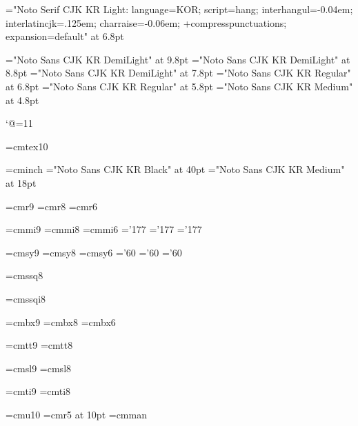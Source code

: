 \sethangulfont\sevenmj="Noto Serif CJK KR Light:%
  language=KOR;%
  script=hang;%
  interhangul=-0.04em;%
  interlatincjk=.125em;%
  charraise=-0.06em;%
  +compresspunctuations;%
  expansion=default" at 6.8pt

\font\texthangul="Noto Sans CJK KR DemiLight" at 9.8pt
\font\texthangulnine="Noto Sans CJK KR DemiLight" at 8.8pt
\font\texthanguleight="Noto Sans CJK KR DemiLight" at 7.8pt
\font\scripthangul="Noto Sans CJK KR Regular" at 6.8pt
\font\scripthangulsix="Noto Sans CJK KR Regular" at 5.8pt
\font\scriptscripthangul="Noto Sans CJK KR Medium" at 4.8pt

%
\catcode`@=11 %

\font\tentex=cmtex10

\font\inchhigh=cminch
\font\titlefont="Noto Sans CJK KR Black" at 40pt
\font\sectionfont="Noto Sans CJK KR Medium" at 18pt

\font\ninerm=cmr9
\font\eightrm=cmr8
\font\sixrm=cmr6

\font\ninei=cmmi9
\font\eighti=cmmi8
\font\sixi=cmmi6
\skewchar\ninei='177 \skewchar\eighti='177 \skewchar\sixi='177

\font\ninesy=cmsy9
\font\eightsy=cmsy8
\font\sixsy=cmsy6
\skewchar\ninesy='60 \skewchar\eightsy='60 \skewchar\sixsy='60

\font\eightss=cmssq8

\font\eightssi=cmssqi8

\font\ninebf=cmbx9
\font\eightbf=cmbx8
\font\sixbf=cmbx6

\font\ninett=cmtt9
\font\eighttt=cmtt8

\hyphenchar{} %
\hyphenchar{}
\hyphenchar{}

\font\ninesl=cmsl9
\font\eightsl=cmsl8

\font\nineit=cmti9
\font\eightit=cmti8

\font\tenu=cmu10 %
\font\magnifiedfiverm=cmr5 at 10pt
\font\cmman=cmman %

%
\newskip\ttglue
\def\tenpoint{\def\rm{\fam0\tenrm\tenmj}%
  \textfont0=\tenrm \scriptfont0=\sevenrm \scriptscriptfont0=\fiverm
  \textfont1=\teni \scriptfont1=\seveni \scriptscriptfont1=\fivei
  \textfont2=\tensy \scriptfont2=\sevensy \scriptscriptfont2=\fivesy
  \textfont3=\tenex \scriptfont3=\tenex \scriptscriptfont3=\tenex
  \setmathhangulfonts\texthangul\scripthangul\scriptscripthangul
  \def\it{\fam\itfam\tenit\tensn}%
  \textfont\itfam=\tenit
  \def\sl{\fam\slfam\tensl\tensn}%
  \textfont\slfam=\tensl
  \def\bf{\fam\bffam\tenbf\tenbd}%
  \textfont\bffam=\tenbf \scriptfont\bffam=\sevenbf
  \scriptscriptfont\bffam=\fivebf
  \def\tt{\fam\ttfam\tentt\tentz}%
  \textfont\ttfam=\tentt
  \tt \ttglue=.5em plus.25em minus.15em
  \normalbaselineskip=15pt
  \let\sc=\eightrm
  \let\big=\tenbig
  \setbox\strutbox=\hbox{\vrule height8.5pt depth3.5pt width\z@}%
  \normalbaselines\rm}

